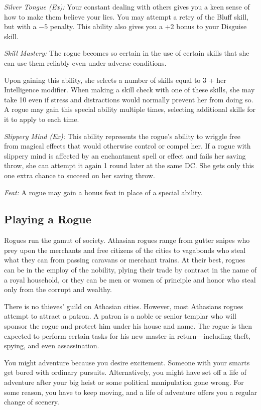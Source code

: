 \textit{Silver Tongue (Ex):} Your constant dealing with others gives you a keen sense of how to make them believe your lies. You may attempt a retry of the Bluff skill, but with a $-5$ penalty. This ability also gives you a +2 bonus to your Disguise skill.

\textit{Skill Mastery:} The rogue becomes so certain in the use of certain skills that she can use them reliably even under adverse conditions.

Upon gaining this ability, she selects a number of skills equal to 3 + her Intelligence modifier. When making a skill check with one of these skills, she may take 10 even if stress and distractions would normally prevent her from doing so. A rogue may gain this special ability multiple times, selecting additional skills for it to apply to each time.

\textit{Slippery Mind (Ex):} This ability represents the rogue's ability to wriggle free from magical effects that would otherwise control or compel her. If a rogue with slippery mind is affected by an enchantment spell or effect and fails her saving throw, she can attempt it again 1 round later at the same DC. She gets only this one extra chance to succeed on her saving throw.

\textit{Feat:} A rogue may gain a bonus feat in place of a special ability.

\subsection{Playing a Rogue}

Rogues run the gamut of society. Athasian rogues range from gutter snipes who prey upon the merchants and free citizens of the cities to vagabonds who steal what they can from passing caravans or merchant trains. At their best, rogues can be in the employ of the nobility, plying their trade by contract in the name of a royal household, or they can be men or women of principle and honor who steal only from the corrupt and wealthy.

There is no thieves' guild on Athasian cities. However, most Athasians rogues attempt to attract a patron. A patron is a noble or senior templar who will sponsor the rogue and protect him under his house and name. The rogue is then expected to perform certain tasks for his new master in return---including theft, spying, and even assassination.

You might adventure because you desire excitement. Someone with your smarts get bored with ordinary pursuits. Alternatively, you might have set off a life of adventure after your big heist or some political manipulation gone wrong. For some reason, you have to keep moving, and a life of adventure offers you a regular change of scenery.

